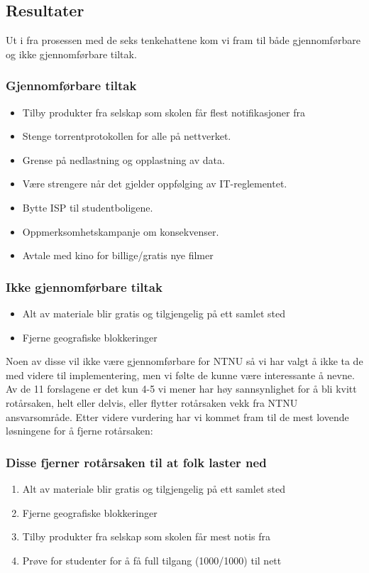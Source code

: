 \subsection{Resultater}
Ut i fra prosessen med de seks tenkehattene kom vi fram til både gjennomførbare og ikke gjennomførbare tiltak. 
\subsubsection*{Gjennomførbare tiltak}
\begin{itemize}
    \item Tilby produkter fra selskap som skolen får flest notifikasjoner fra
    \item Stenge torrentprotokollen for alle på nettverket.
    \item Grense på nedlastning og opplastning av data.
    \item Være strengere når det gjelder oppfølging av IT-reglementet. 
    \item Bytte ISP til studentboligene.
    \item Oppmerksomhetskampanje om konsekvenser.
    \item Avtale med kino for billige/gratis nye filmer
\end{itemize}

\subsubsection*{Ikke gjennomførbare tiltak}
\begin{itemize}
    \item Alt av materiale blir gratis og tilgjengelig på ett samlet sted
    \item Fjerne geografiske blokkeringer
\end{itemize}

Noen av disse vil ikke være gjennomførbare for NTNU så vi har valgt å ikke ta de med videre til implementering, men vi følte de kunne være interessante å nevne. Av de 11 forslagene er det kun 4-5 vi mener har høy sannsynlighet for å bli kvitt rotårsaken, helt eller delvis, eller flytter rotårsaken vekk fra NTNU ansvarsområde. Etter videre vurdering har vi kommet fram til de mest lovende løsningene for å fjerne rotårsaken: 
\subsubsection*{Disse fjerner rotårsaken til at folk laster ned}
\begin{enumerate}
    \item Alt av materiale blir gratis og tilgjengelig på ett samlet sted
    \item Fjerne geografiske blokkeringer
    \item Tilby produkter fra selskap som skolen får mest notis fra
    \item Prøve for studenter for å få full tilgang (1000/1000) til nett
\end{enumerate}
